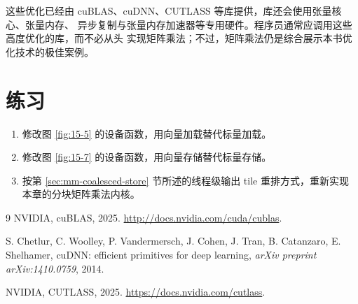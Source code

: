 这些优化已经由 cuBLAS、cuDNN、CUTLASS 等库提供，库还会使用张量核心、张量内存、
异步复制与张量内存加速器等专用硬件。程序员通常应调用这些高度优化的库，而不必从头
实现矩阵乘法；不过，矩阵乘法仍是综合展示本书优化技术的极佳案例。

\section*{练习}

\begin{enumerate}[label=\arabic*.,leftmargin=2.7em]
  \item 修改图 \ref{fig:15-5} 的设备函数，用向量加载替代标量加载。
  \item 修改图 \ref{fig:15-7} 的设备函数，用向量存储替代标量存储。
  \item 按第 \ref{sec:mm-coalesced-store} 节所述的线程级输出 tile 重排方式，重新实现
  本章的分块矩阵乘法内核。
\end{enumerate}

\begin{chapterbibliography}{9}
  NVIDIA, cuBLAS, 2025. \url{http://docs.nvidia.com/cuda/cublas}.

  S. Chetlur, C. Woolley, P. Vandermersch, J. Cohen, J. Tran, B. Catanzaro,
  E. Shelhamer, cuDNN: efficient primitives for deep learning,
  \emph{arXiv preprint arXiv:1410.0759}, 2014.

  NVIDIA, CUTLASS, 2025. \url{https://docs.nvidia.com/cutlass}.
\end{chapterbibliography}
